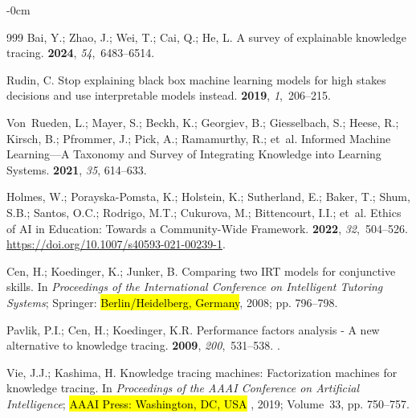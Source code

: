 \documentclass[applsci,article,accept,moreauthors,pdftex]{Definitions/mdpi}
\begin{document}
\begin{adjustwidth}{-\extralength}{0cm}
\begin{thebibliography}{999}
Bai, Y.; Zhao, J.; Wei, T.; Cai, Q.; He, L.
\newblock A survey of explainable knowledge tracing.
 {\bf 2024}, {\em 54},~6483--6514.

Rudin, C.
\newblock Stop explaining black box machine learning models for high stakes
  decisions and use interpretable models instead.
 {\bf 2019}, {\em 1},~206--215.

Von~Rueden, L.; Mayer, S.; Beckh, K.; Georgiev, B.; Giesselbach, S.; Heese, R.;
  Kirsch, B.; Pfrommer, J.; Pick, A.; Ramamurthy, R.;  et~al.
\newblock Informed Machine Learning---A Taxonomy and Survey of Integrating
  Knowledge into Learning Systems.
 {\bf 2021}, \textit{35},
  614--633.

Holmes, W.; Porayska-Pomsta, K.; Holstein, K.; Sutherland, E.; Baker, T.; Shum,
  S.B.; Santos, O.C.; Rodrigo, M.T.; Cukurova, M.; Bittencourt, I.I.;  et~al.
\newblock Ethics of AI in Education: Towards a Community-Wide Framework.
  {\bf 2022}, {\em 32},~504–526.
\newblock 
  {\url{https://doi.org/10.1007/s40593-021-00239-1}}.

Cen, H.; Koedinger, K.; Junker, B.
\newblock Comparing two IRT models for conjunctive skills.
\newblock In \textit{Proceedings of the International Conference on Intelligent
  Tutoring Systems}; Springer: \hl{Berlin/Heidelberg, Germany}, %
 2008; pp. 796--798.

Pavlik, P.I.; Cen, H.; Koedinger, K.R.
\newblock Performance factors analysis - A new alternative to knowledge
  tracing.
 {\bf
  2009}, {\em 200},~531–538.
.

Vie, J.J.; Kashima, H.
\newblock Knowledge tracing machines: Factorization machines for knowledge
  tracing.
\newblock In \textit{Proceedings of the AAAI Conference on
  Artificial Intelligence}; \hl{AAAI Press: Washington, DC, USA}%
, 2019; Volume~33, pp. 750--757.



\end{thebibliography}
\end{adjustwidth}
\end{document}
